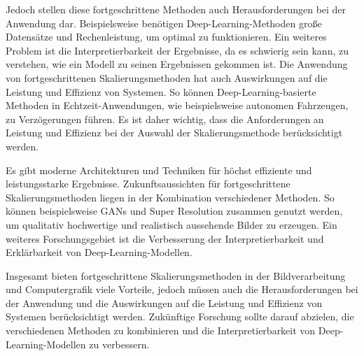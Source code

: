    Jedoch stellen diese fortgeschrittene Methoden auch Herausforderungen bei der Anwendung dar.      
    Beispielsweise benötigen Deep-Learning-Methoden große Datensätze und Rechenleistung, um optimal zu funktionieren.      
    Ein weiteres Problem ist die Interpretierbarkeit der Ergebnisse, da es schwierig sein kann, zu verstehen, wie ein Modell zu seinen Ergebnissen gekommen ist.
    Die Anwendung von fortgeschrittenen Skalierungsmethoden hat auch Auswirkungen auf die Leistung und Effizienz von Systemen.      
    So können Deep-Learning-basierte Methoden in Echtzeit-Anwendungen, wie beispielsweise autonomen Fahrzeugen, zu Verzögerungen führen.      
    Es ist daher wichtig, dass die Anforderungen an Leistung und Effizienz bei der Auswahl der Skalierungsmethode berücksichtigt werden.
    
    Es gibt moderne Architekturen und Techniken für höchst effiziente und leistungsstarke Ergebnisse.
    Zukunftsaussichten für fortgeschrittene Skalierungsmethoden liegen in der Kombination verschiedener Methoden. 
    So können beispielsweise GANs und Super Resolution zusammen genutzt werden, um qualitativ hochwertige und realistisch aussehende Bilder zu erzeugen.      
    Ein weiteres Forschungsgebiet ist die Verbesserung der Interpretierbarkeit und Erklärbarkeit von Deep-Learning-Modellen.      
    
    Insgesamt bieten fortgeschrittene Skalierungsmethoden in der Bildverarbeitung und Computergrafik viele Vorteile, jedoch müssen auch die Herausforderungen bei der Anwendung und die Auswirkungen auf die Leistung und Effizienz von Systemen berücksichtigt werden.      
    Zukünftige Forschung sollte darauf abzielen, die verschiedenen Methoden zu kombinieren und die Interpretierbarkeit von Deep-Learning-Modellen zu verbessern.

\newpage